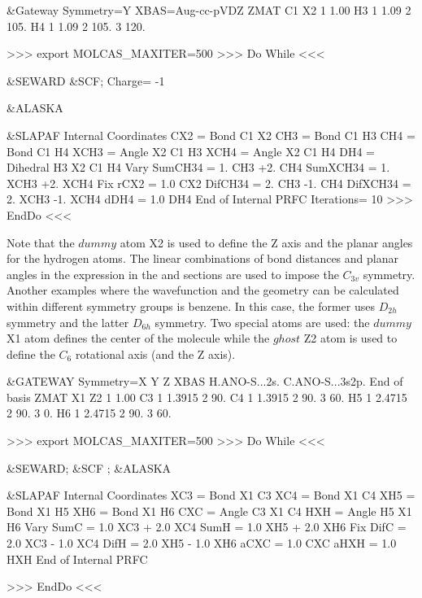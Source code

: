 \begin{sourcelisting}
 &Gateway
   Symmetry=Y
   XBAS=Aug-cc-pVDZ
   ZMAT
   C1
   X2   1  1.00
   H3   1  1.09   2 105.
   H4   1  1.09   2 105.    3  120.

>>>  export MOLCAS_MAXITER=500
>>>  Do  While  <<<

 &SEWARD
 &SCF; Charge= -1

 &ALASKA

 &SLAPAF
   Internal Coordinates
    CX2  = Bond C1 X2
    CH3  = Bond C1 H3
    CH4  = Bond C1 H4
    XCH3 = Angle X2 C1 H3
    XCH4 = Angle X2 C1 H4
    DH4  = Dihedral H3 X2 C1 H4
   Vary
    SumCH34  = 1. CH3  +2. CH4
    SumXCH34 = 1. XCH3 +2. XCH4
   Fix
    rCX2  = 1.0 CX2
    DifCH34  = 2. CH3  -1. CH4
    DifXCH34 = 2. XCH3 -1. XCH4
    dDH4  = 1.0 DH4
   End of Internal
   PRFC
   Iterations= 10
>>>  EndDo  <<<
\end{sourcelisting}

Note that the $dummy$ atom X2 is used to define the Z axis and the planar angles 
for the hydrogen atoms.  The linear combinations of bond distances and planar
angles in the expression in the  and  sections are used 
to impose the $C_{3v}$ symmetry.\\

Another examples where the wavefunction and the geometry can be calculated
within different symmetry groups is benzene. In this case, the former uses
$D_{2h}$ symmetry and the latter $D_{6h}$ symmetry.  Two special atoms are
used: the $dummy$ X1 atom defines the center of the molecule while the $ghost$
Z2 atom is used to define the $C_6$ rotational axis (and the Z axis).

\begin{sourcelisting}
 &GATEWAY
   Symmetry=X Y Z
   XBAS
   H.ANO-S...2s.
   C.ANO-S...3s2p.
   End of basis
   ZMAT
   X1
   Z2   1  1.00
   C3   1  1.3915   2  90.
   C4   1  1.3915   2  90.    3  60.
   H5   1  2.4715   2  90.    3   0.
   H6   1  2.4715   2  90.    3  60.


>>>  export MOLCAS_MAXITER=500
>>>  Do  While  <<<

 &SEWARD; &SCF ; &ALASKA

 &SLAPAF
   Internal Coordinates
      XC3 = Bond X1 C3
      XC4 = Bond X1 C4
      XH5 = Bond X1 H5
      XH6 = Bond X1 H6
      CXC = Angle C3 X1 C4
      HXH = Angle H5 X1 H6
   Vary
      SumC = 1.0 XC3 + 2.0 XC4
      SumH = 1.0 XH5 + 2.0 XH6
   Fix
      DifC = 2.0 XC3 - 1.0 XC4
      DifH = 2.0 XH5 - 1.0 XH6
      aCXC = 1.0 CXC
      aHXH = 1.0 HXH
   End of Internal
   PRFC

>>> EndDo <<<
\end{sourcelisting}


